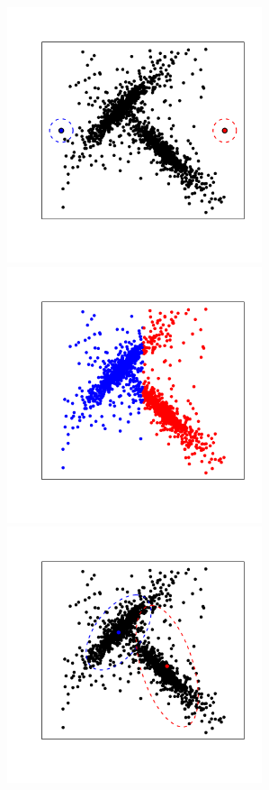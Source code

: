 \documentclass[landscape,footrule]{foils}
\begin{document}
\begin{center}
\includegraphics[width=7.5cm]{hard-gmm-1}\hspace*{-1cm}
\includegraphics[width=7.5cm]{hard-gmm-2}\hspace*{-1cm}
\includegraphics[width=7.5cm]{hard-gmm-3}
\vspace{-2cm}


\end{center}
\end{document}
